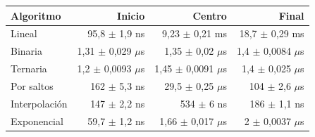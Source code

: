 {\small
\begin{tabular}{lrrr}
\toprule
Algoritmo & Inicio & Centro & Final \\
\midrule
Lineal & 95,8 $\pm$ 1,9 ns & 9,23 $\pm$ 0,21 ms & 18,7 $\pm$ 0,29 ms \\
Binaria & 1,31 $\pm$ 0,029 $\mu$s & 1,35 $\pm$ 0,02 $\mu$s & 1,4 $\pm$ 0,0084 $\mu$s \\
Ternaria & 1,2 $\pm$ 0,0093 $\mu$s & 1,45 $\pm$ 0,0091 $\mu$s & 1,4 $\pm$ 0,025 $\mu$s \\
Por saltos & 162 $\pm$ 5,3 ns & 29,5 $\pm$ 0,25 $\mu$s & 104 $\pm$ 2,6 $\mu$s \\
Interpolaci\'on & 147 $\pm$ 2,2 ns & 534 $\pm$ 6 ns & 186 $\pm$ 1,1 ns \\
Exponencial & 59,7 $\pm$ 1,2 ns & 1,66 $\pm$ 0,017 $\mu$s & 2 $\pm$ 0,0037 $\mu$s \\
\bottomrule
\end{tabular}}\par
